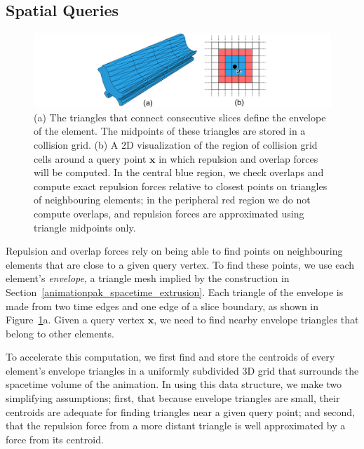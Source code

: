 \subsection{Spatial Queries}
\label{animationpak_spatial_queries}

\begin{figure}
\centering
\includegraphics[width=1.0\textwidth]{figures/animationpak/collision_grid.pdf} 
\caption[An envelope and a collision grid]
{\label{fig_animationpak_collision_grid} 
(a) The triangles that connect consecutive slices define the envelope of the
element.  The midpoints of these triangles are stored in a collision grid.
(b) A 2D visualization of the region of collision
grid cells around a query point 
$\bm{x}$ 
in which repulsion and overlap forces will be computed.  In the central blue
region, we check overlaps and compute exact repulsion forces relative to
closest points on triangles of neighbouring elements; in the peripheral
red region we do not compute overlaps, and repulsion forces are approximated
using triangle midpoints only.}
\end{figure}

Repulsion and overlap forces rely on being able to find points on
neighbouring elements that are close to a given query vertex.
To find these points, we use each element's
\textit{envelope}, a triangle mesh implied by the construction in
Section~\ref{animationpak_spacetime_extrusion}.  Each triangle of the envelope 
is made from two time edges and one edge of a slice boundary, as
shown in Figure~\ref{fig_animationpak_collision_grid}a.  Given a query vertex 
$\bm{x}$, we need to find nearby envelope triangles that belong to
other elements.

To accelerate this computation, we first find and store the centroids of
every element's envelope triangles in a uniformly subdivided 3D grid that
surrounds the spacetime volume of the animation.  In using this data
structure, we make two simplifying assumptions; first, that because 
envelope triangles are small, their centroids
are adequate for finding triangles near a given query point; and second,
that the repulsion force from a more distant triangle is well approximated
by a force from its centroid.

